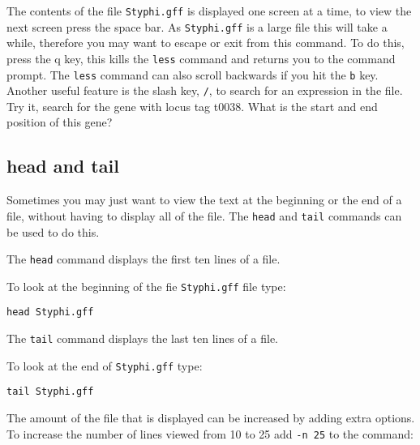 \documentclass[11pt]{article}
\makeatletter
\newcommand{\boxspacing}{\kern\kvtcb@left@rule\kern\kvtcb@boxsep}
\newcommand{\prompt}[4]{
        {\ttfamily\llap{{\color{blue}\LARGE\faKeyboardO\hspace{3pt}#4}}\vspace{-\baselineskip}}
    }
\makeatother
\begin{document}
    The contents of the file \texttt{Styphi.gff} is displayed one screen at
a time, to view the next screen press the space bar. As
\texttt{Styphi.gff} is a large file this will take a while, therefore
you may want to escape or exit from this command. To do this, press the
q key, this kills the \texttt{less} command and returns you to the
command prompt. The \texttt{less} command can also scroll backwards if
you hit the \texttt{b} key. Another useful feature is the slash key,
\texttt{/}, to search for an expression in the file. Try it, search for
the gene with locus tag t0038. What is the start and end position of
this gene?

    \hypertarget{head-and-tail}{%
\subsection{head and tail}\label{head-and-tail}}

Sometimes you may just want to view the text at the beginning or the end
of a file, without having to display all of the file. The \texttt{head}
and \texttt{tail} commands can be used to do this.

    The \texttt{head} command displays the first ten lines of a file.

To look at the beginning of the fie \texttt{Styphi.gff} file type:

    \begin{tcolorbox}[breakable, size=fbox, boxrule=1pt, pad at break*=1mm,colback=cellbackground, colframe=cellborder]
\prompt{In}{incolor}{ }{\boxspacing}
\begin{Verbatim}[commandchars=\\\{\}]
head Styphi.gff
\end{Verbatim}
\end{tcolorbox}

    The \texttt{tail} command displays the last ten lines of a file.

To look at the end of \texttt{Styphi.gff} type:

    \begin{tcolorbox}[breakable, size=fbox, boxrule=1pt, pad at break*=1mm,colback=cellbackground, colframe=cellborder]
\prompt{In}{incolor}{ }{\boxspacing}
\begin{Verbatim}[commandchars=\\\{\}]
tail Styphi.gff
\end{Verbatim}
\end{tcolorbox}

    The amount of the file that is displayed can be increased by adding
extra options. To increase the number of lines viewed from 10 to 25 add
\texttt{-n\ 25} to the command:
\end{document}
